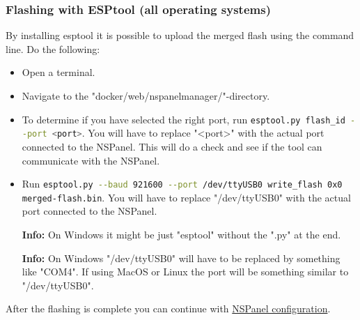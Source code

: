 \documentclass[10pt]{article}
\newcommand{\info}[1]{\begin{infoBox} \textbf{Info:} #1 \end{infoBox}}
\begin{document}
    \subsubsection{Flashing with ESPtool (all operating systems)}
    By installing esptool it is possible to upload the merged flash using the command line. Do the following:
    \begin{itemize}
      \item Open a terminal.
      \item Navigate to the "docker/web/nspanelmanager/"-directory.
      \item To determine if you have selected the right port, run \lstinline[language=bash]|esptool.py flash_id --port <port>|. You will have to replace "<port>" with the actual port connected to the NSPanel. This will do a check and see if the tool can communicate with the NSPanel.
      \item Run \lstinline[language=bash]|esptool.py --baud 921600 --port /dev/ttyUSB0 write_flash 0x0 merged-flash.bin|. You will have to replace "/dev/ttyUSB0" with the actual port connected to the NSPanel.
      \info{On Windows it might be just "esptool" without the ".py" at the end.}
      \info{On Windows "/dev/ttyUSB0" will have to be replaced by something like "COM4". If using MacOS or Linux the port will be something similar to "/dev/ttyUSB0".}
    \end{itemize}
    After the flashing is complete you can continue with \hyperref[sec:nspanel_configuration]{NSPanel configuration}.
 
\end{document}
